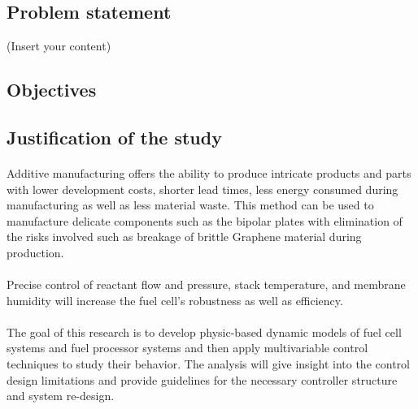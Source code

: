 \subsection{Problem statement}
(Insert your content)
\subsection{Objectives}
\cite{stewart_platform_1965}
\subsection{Justification of the study}
\paragraph{}Additive manufacturing offers the ability to produce intricate products and parts with lower development costs, shorter lead times, less energy consumed during manufacturing as well as less material waste. This method can be used to manufacture delicate components such as the bipolar plates with elimination of the risks involved such as breakage of brittle Graphene material during production.     
\paragraph{}Precise control of reactant flow and pressure, stack temperature, and membrane humidity will increase the fuel cell’s robustness as well as efficiency.
\paragraph{}The goal of this research is to develop physic-based dynamic models of fuel cell systems and fuel processor systems and then apply multivariable control techniques to study their behavior. The analysis will give insight into the control design limitations and provide guidelines for the necessary controller structure and system re-design.

